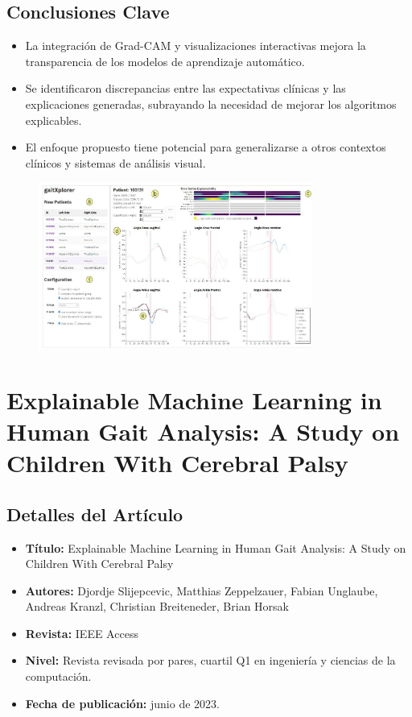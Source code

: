 \documentclass{report}
\begin{document}
\subsection{Conclusiones Clave}
\begin{itemize}
    \item La integración de Grad-CAM y visualizaciones interactivas mejora la transparencia de los modelos de aprendizaje automático.
    \item Se identificaron discrepancias entre las expectativas clínicas y las explicaciones generadas, subrayando la necesidad de mejorar los algoritmos explicables.
    \item El enfoque propuesto tiene potencial para generalizarse a otros contextos clínicos y sistemas de análisis visual.
\end{itemize}

\begin{figure}[H] 
    \centering
    \includegraphics[width=0.8\textwidth]{Images/Rind2022.jpg}
\end{figure}




\section{Explainable Machine Learning in Human Gait Analysis: A Study on Children With Cerebral Palsy}

\subsection{Detalles del Artículo}
\begin{itemize}
    \item \textbf{Título:} Explainable Machine Learning in Human Gait Analysis: A Study on Children With Cerebral Palsy
    \item \textbf{Autores:} Djordje Slijepcevic, Matthias Zeppelzauer, Fabian Unglaube, Andreas Kranzl, Christian Breiteneder, Brian Horsak
    \item \textbf{Revista:} IEEE Access
    \item \textbf{Nivel:} Revista revisada por pares, cuartil Q1 en ingeniería y ciencias de la computación.
    \item \textbf{Fecha de publicación:} junio de 2023.
\end{itemize}
\end{document}
